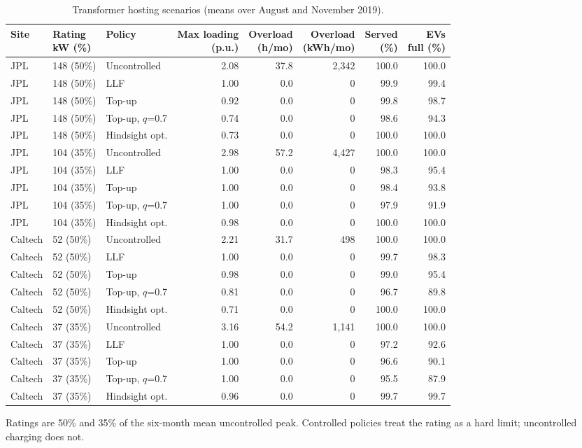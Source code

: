 \begin{table}[!htbp]
\centering
\caption{Transformer hosting scenarios (means over August and November 2019).}
\label{tab:xfmr}
\footnotesize
\setlength{\tabcolsep}{1.5pt}
\begin{tabular*}{\textwidth}{@{\extracolsep{\fill}}lllrrrrr@{}}
\hline
Site & \makecell[c]{Rating\\kW (\%)} & Policy & \makecell[c]{Max loading\\(p.u.)} & \makecell[c]{Overload\\(h/mo)} & \makecell[c]{Overload\\(kWh/mo)} & \makecell[c]{Served\\(\%)} & \makecell[c]{EVs\\full (\%)} \\
\hline
JPL & 148 (50\%) & Uncontrolled & 2.08 & 37.8 & 2,342 & 100.0 & 100.0 \\
JPL & 148 (50\%) & LLF & 1.00 & 0.0 & 0 & 99.9 & 99.4 \\
JPL & 148 (50\%) & Top-up & 0.92 & 0.0 & 0 & 99.8 & 98.7 \\
JPL & 148 (50\%) & Top-up, $q$=0.7 & 0.74 & 0.0 & 0 & 98.6 & 94.3 \\
JPL & 148 (50\%) & Hindsight opt. & 0.73 & 0.0 & 0 & 100.0 & 100.0 \\
JPL & 104 (35\%) & Uncontrolled & 2.98 & 57.2 & 4,427 & 100.0 & 100.0 \\
JPL & 104 (35\%) & LLF & 1.00 & 0.0 & 0 & 98.3 & 95.4 \\
JPL & 104 (35\%) & Top-up & 1.00 & 0.0 & 0 & 98.4 & 93.8 \\
JPL & 104 (35\%) & Top-up, $q$=0.7 & 1.00 & 0.0 & 0 & 97.9 & 91.9 \\
JPL & 104 (35\%) & Hindsight opt. & 0.98 & 0.0 & 0 & 100.0 & 100.0 \\
\hline
Caltech & 52 (50\%) & Uncontrolled & 2.21 & 31.7 & 498 & 100.0 & 100.0 \\
Caltech & 52 (50\%) & LLF & 1.00 & 0.0 & 0 & 99.7 & 98.3 \\
Caltech & 52 (50\%) & Top-up & 0.98 & 0.0 & 0 & 99.0 & 95.4 \\
Caltech & 52 (50\%) & Top-up, $q$=0.7 & 0.81 & 0.0 & 0 & 96.7 & 89.8 \\
Caltech & 52 (50\%) & Hindsight opt. & 0.71 & 0.0 & 0 & 100.0 & 100.0 \\
Caltech & 37 (35\%) & Uncontrolled & 3.16 & 54.2 & 1,141 & 100.0 & 100.0 \\
Caltech & 37 (35\%) & LLF & 1.00 & 0.0 & 0 & 97.2 & 92.6 \\
Caltech & 37 (35\%) & Top-up & 1.00 & 0.0 & 0 & 96.6 & 90.1 \\
Caltech & 37 (35\%) & Top-up, $q$=0.7 & 1.00 & 0.0 & 0 & 95.5 & 87.9 \\
Caltech & 37 (35\%) & Hindsight opt. & 0.96 & 0.0 & 0 & 99.7 & 99.7 \\
\hline
\end{tabular*}
\par\smallskip\parbox{\textwidth}{\scriptsize Ratings are 50\% and 35\% of the six-month mean uncontrolled peak. Controlled policies treat the rating as a hard limit; uncontrolled charging does not.}
\end{table}
